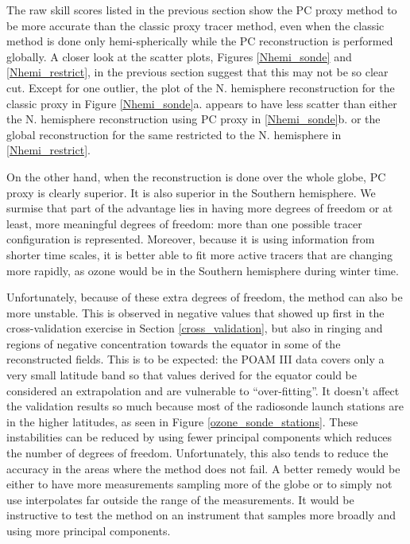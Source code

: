 The raw skill scores listed in the previous section show the PC proxy method
to be more accurate than the classic proxy tracer method, even when the classic
method is done only hemi-spherically while the PC reconstruction is
performed globally.
A closer look at the scatter plots, 
Figures \ref{Nhemi_sonde} and \ref{Nhemi_restrict}, in the previous section
suggest that this may not be so clear cut.
Except for one outlier, the plot of the N. hemisphere reconstruction for
the classic proxy in Figure \ref{Nhemi_sonde}a. appears to have less scatter than either the N. hemisphere
reconstruction using PC proxy in \ref{Nhemi_sonde}b. or the global reconstruction for the same
restricted to the N. hemisphere in \ref{Nhemi_restrict}.

On the other hand, when the reconstruction is done over the whole globe,
PC proxy is clearly superior.
It is also superior in the Southern hemisphere.
We surmise that part of the advantage lies in having more degrees of freedom
or at least, more meaningful degrees of freedom: more than one possible
tracer configuration is represented.
Moreover, because it is using information from shorter time scales, it
is better able to fit more active tracers that are changing more rapidly,
as ozone would be in the Southern hemisphere during winter time.

Unfortunately, because of these extra degrees of freedom, the method can also
be more unstable.
This is observed in negative values that showed up first in the cross-validation
exercise in Section \ref{cross_validation}, but also in ringing and regions
of negative concentration towards the equator in some of the reconstructed
fields.
This is to be expected: the POAM III data covers only a very small latitude 
band so that values derived for the equator could be considered an
extrapolation and are vulnerable to ``over-fitting''.
It doesn't affect the validation results so much because most of the 
radiosonde launch stations are in the higher latitudes, as seen in
Figure \ref{ozone_sonde_stations}.
These instabilities can be reduced by using fewer principal components which
reduces the number of degrees of freedom.
Unfortunately, this also tends to reduce the accuracy in the areas where the
method does not fail.
A better remedy would be either to have more measurements sampling more of
the globe or to simply not use interpolates far outside the range of the
measurements.
It would be instructive to test the method on an instrument that samples
more broadly and using more principal components.

